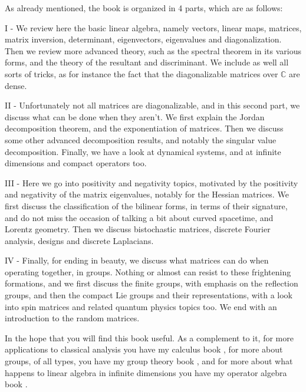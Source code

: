 \documentclass[12pt]{amsbook}
\begin{document}
\bigskip

As already mentioned, the book is organized in 4 parts, which are as follows:

\bigskip

I - We review here the basic linear algebra, namely vectors, linear maps, matrices, matrix inversion, determinant, eigenvectors, eigenvalues and diagonalization. Then we review more advanced theory, such as the spectral theorem in its various forms, and the theory of the resultant and discriminant. We include as well all sorts of tricks, as for instance the fact that the diagonalizable matrices over $\mathbb C$ are dense.

\bigskip

II - Unfortunately not all matrices are diagonalizable, and in this second part, we discuss what can be done when they aren't. We first explain the Jordan decomposition theorem, and the exponentiation of matrices. Then we discuss some other advanced decomposition results, and notably the singular value decomposition. Finally, we have a look at dynamical systems, and at infinite dimensions and compact operators too. 

\bigskip

III - Here we go into positivity and negativity topics, motivated by the positivity and negativity of the matrix eigenvalues, notably for the Hessian matrices. We first discuss the classification of the bilinear forms, in terms of their signature, and do not miss the occasion of talking a bit about curved spacetime, and Lorentz geometry. Then we discuss bistochastic matrices, discrete Fourier analysis, designs and discrete Laplacians.

\bigskip

IV - Finally, for ending in beauty, we discuss what matrices can do when operating together, in groups. Nothing or almost can resist to these frightening formations, and we first discuss the finite groups, with emphasis on the reflection groups, and then the compact Lie groups and their representations, with a look into spin matrices and related quantum physics topics too. We end with an introduction to the random matrices.

\bigskip

In the hope that you will find this book useful. As a complement to it, for more applications to classical analysis you have my calculus book \cite{ba1}, for more about groups, of all types, you have my group theory book \cite{ba2}, and for more about what happens to linear algebra in infinite dimensions you have my operator algebra book \cite{ba3}. 
\end{document}
